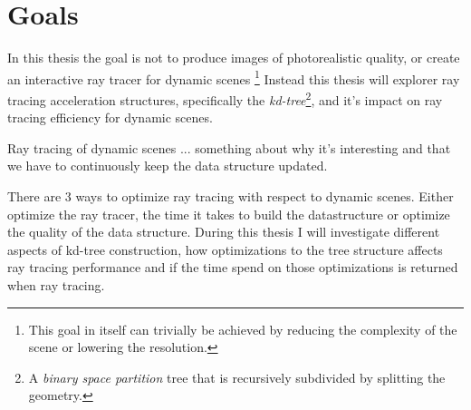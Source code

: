 






\section{Goals}

In this thesis the goal is not to produce images of photorealistic
quality, or create an interactive ray tracer for dynamic
scenes \footnote{This goal in itself can trivially be achieved by
  reducing the complexity of the scene or lowering the resolution.}
Instead this thesis will explorer ray tracing acceleration structures,
specifically the \textit{kd-tree}\footnote{A \textit{binary space
    partition} tree that is recursively subdivided by splitting the
  geometry.}, and it's impact on ray tracing efficiency for dynamic
scenes. 

Ray tracing of dynamic scenes ... something about why it's interesting
and that we have to continuously keep the data structure updated.

There are 3 ways to optimize ray tracing with respect to dynamic
scenes. Either optimize the ray tracer, the time it takes to build the
datastructure or optimize the quality of the data structure. During
this thesis I will investigate different aspects of kd-tree
construction, how optimizations to the tree structure affects ray
tracing performance and if the time spend on those optimizations is
returned when ray tracing.

